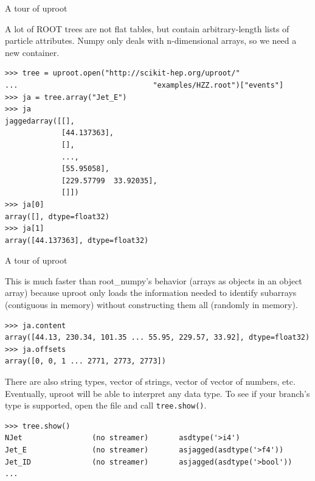 \documentclass[aspectratio=169]{beamer}
\begin{document}
\begin{frame}[fragile]{A tour of uproot}
\vspace{0.4 cm}
\small

{\normalsize A lot of ROOT trees are not flat tables, but contain arbitrary-length lists of particle attributes. Numpy only deals with n-dimensional arrays, so we need a new container.}

\begin{verbatim}
>>> tree = uproot.open("http://scikit-hep.org/uproot/"
...                               "examples/HZZ.root")["events"]
>>> ja = tree.array("Jet_E")
>>> ja
jaggedarray([[],
             [44.137363],
             [],
             ...,
             [55.95058],
             [229.57799  33.92035],
             []])
>>> ja[0]
array([], dtype=float32)
>>> ja[1]
array([44.137363], dtype=float32)
\end{verbatim}
\end{frame}

\begin{frame}[fragile]{A tour of uproot}
\vspace{0.4 cm}
\small

{\normalsize This is much faster than root\_numpy's behavior (arrays as objects in an object array) because uproot only loads the information needed to identify subarrays (contiguous in memory) without constructing them all (randomly in memory).}

\begin{verbatim}
>>> ja.content
array([44.13, 230.34, 101.35 ... 55.95, 229.57, 33.92], dtype=float32)
>>> ja.offsets
array([0, 0, 1 ... 2771, 2773, 2773])
\end{verbatim}

\vspace{0.2 cm}
{\normalsize There are also string types, vector of strings, vector of vector of numbers, etc. Eventually, uproot will be able to interpret any data type. To see if your branch's type is supported, open the file and call {\tt\small tree.show()}.}

\begin{verbatim}
>>> tree.show()
NJet                (no streamer)       asdtype('>i4')
Jet_E               (no streamer)       asjagged(asdtype('>f4'))
Jet_ID              (no streamer)       asjagged(asdtype('>bool'))
...
\end{verbatim}
\end{frame}
\end{document}
